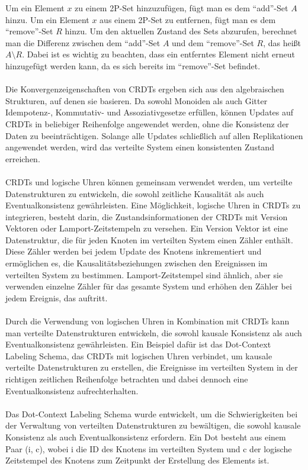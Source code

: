Um ein Element $x$ zu einem 2P-Set hinzuzufügen, fügt man es dem \enquote{add}-Set $A$ hinzu. Um ein Element $x$ aus einem 2P-Set zu entfernen, fügt man es dem \enquote{remove}-Set $R$ hinzu. Um den aktuellen Zustand des Sets abzurufen, berechnet man die Differenz zwischen dem \enquote{add}-Set $A$ und dem \enquote{remove}-Set $R$, das heißt $A \setminus R$. Dabei ist es wichtig zu beachten, dass ein entferntes Element nicht erneut hinzugefügt werden kann, da es sich bereits im \enquote{remove}-Set befindet.
\\\\
Die Konvergenzeigenschaften von CRDTs ergeben sich aus den algebraischen Strukturen, auf denen sie basieren. Da sowohl Monoiden als auch Gitter Idempotenz-, Kommutativ- und Assoziativgesetze erfüllen, können Updates auf CRDTs in beliebiger Reihenfolge angewendet werden, ohne die Konsistenz der Daten zu beeinträchtigen. Solange alle Updates schließlich auf allen Replikationen angewendet werden, wird das verteilte System einen konsistenten Zustand erreichen.
\\\\
CRDTs und logische Uhren können gemeinsam verwendet werden, um verteilte Datenstrukturen zu entwickeln, die sowohl zeitliche Kausalität als auch Eventualkonsistenz gewährleisten. Eine Möglichkeit, logische Uhren in CRDTs zu integrieren, besteht darin, die Zustandsinformationen der CRDTs mit Version Vektoren oder Lamport-Zeitstempeln zu versehen.
Ein Version Vektor ist eine Datenstruktur, die für jeden Knoten im verteilten System einen Zähler enthält. Diese Zähler werden bei jedem Update des Knotens inkrementiert und ermöglichen es, die Kausalitätsbeziehungen zwischen den Ereignissen im verteilten System zu bestimmen. Lamport-Zeitstempel sind ähnlich, aber sie verwenden einzelne Zähler für das gesamte System und erhöhen den Zähler bei jedem Ereignis, das auftritt.
\\\\
Durch die Verwendung von logischen Uhren in Kombination mit CRDTs kann man verteilte Datenstrukturen entwickeln, die sowohl kausale Konsistenz als auch Eventualkonsistenz gewährleisten. Ein Beispiel dafür ist das Dot-Context Labeling Schema, das CRDTs mit logischen Uhren verbindet, um kausale verteilte Datenstrukturen zu erstellen, die Ereignisse im verteilten System in der richtigen zeitlichen Reihenfolge betrachten und dabei dennoch eine Eventualkonsistenz aufrechterhalten.
\\\\
Das Dot-Context Labeling Schema wurde entwickelt, um die Schwierigkeiten bei der Verwaltung von verteilten Datenstrukturen zu bewältigen, die sowohl kausale Konsistenz als auch Eventualkonsistenz erfordern. Ein Dot besteht aus einem Paar (i, c), wobei i die ID des Knotens im verteilten System und c der logische Zeitstempel des Knotens zum Zeitpunkt der Erstellung des Elements ist.
